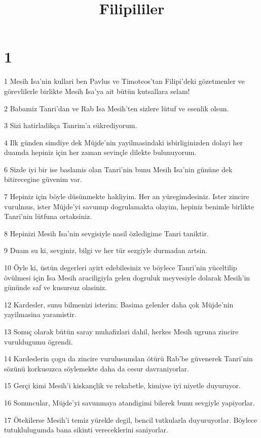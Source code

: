 

\title{Filipililer}


\chapter{1}

\par 1 Mesih Isa'nin kullari ben Pavlus ve Timoteos'tan Filipi'deki gözetmenler ve görevlilerle birlikte Mesih Isa'ya ait bütün kutsallara selam!
\par 2 Babamiz Tanri'dan ve Rab Isa Mesih'ten sizlere lütuf ve esenlik olsun.
\par 3 Sizi hatirladikça Tanrim'a sükrediyorum.
\par 4 Ilk günden simdiye dek Müjde'nin yayilmasindaki isbirliginizden dolayi her duamda hepiniz için her zaman sevinçle dilekte bulunuyorum.
\par 6 Sizde iyi bir ise baslamis olan Tanri'nin bunu Mesih Isa'nin gününe dek bitirecegine güvenim var.
\par 7 Hepiniz için böyle düsünmekte hakliyim. Her an yüregimdesiniz. Ister zincire vurulmus, ister Müjde'yi savunup dogrulamakta olayim, hepiniz benimle birlikte Tanri'nin lütfuna ortaksiniz.
\par 8 Hepinizi Mesih Isa'nin sevgisiyle nasil özledigime Tanri taniktir.
\par 9 Duam su ki, sevginiz, bilgi ve her tür sezgiyle durmadan artsin.
\par 10 Öyle ki, üstün degerleri ayirt edebilesiniz ve böylece Tanri'nin yüceltilip övülmesi için Isa Mesih araciligiyla gelen dogruluk meyvesiyle dolarak Mesih'in gününde saf ve kusursuz olasiniz.
\par 12 Kardesler, sunu bilmenizi isterim: Basima gelenler daha çok Müjde'nin yayilmasina yaramistir.
\par 13 Sonuç olarak bütün saray muhafizlari dahil, herkes Mesih ugruna zincire vuruldugumu ögrendi.
\par 14 Kardeslerin çogu da zincire vurulusumdan ötürü Rab'be güvenerek Tanri'nin sözünü korkusuzca söylemekte daha da cesur davraniyorlar.
\par 15 Gerçi kimi Mesih'i kiskançlik ve rekabetle, kimiyse iyi niyetle duyuruyor.
\par 16 Sonuncular, Müjde'yi savunmaya atandigimi bilerek bunu sevgiyle yapiyorlar.
\par 17 Ötekilerse Mesih'i temiz yürekle degil, bencil tutkularla duyuruyorlar. Böylece tutuklulugumda bana sikinti vereceklerini saniyorlar.
